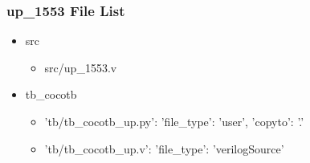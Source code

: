 \subsubsection{up\_1553 File List}
\begin{itemize}
\item src
	\begin{itemize}
	\item src/up\_1553.v
	\end{itemize}
\item tb\_cocotb
	\begin{itemize}
	\item {'tb/tb\_cocotb\_up.py': {'file\_type': 'user', 'copyto': '.'}}
	\item {'tb/tb\_cocotb\_up.v': {'file\_type': 'verilogSource'}}
	\end{itemize}
\end{itemize}
